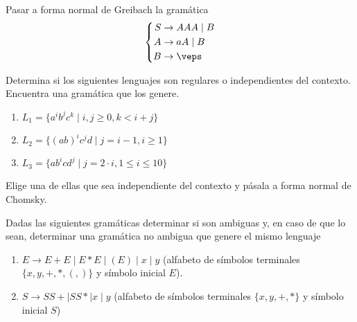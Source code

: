 \begin{ejercicio}\label{ej:1.4.12}
    Pasar a forma normal de Greibach la gramática
    \begin{equation*}
        \left\{
            \begin{aligned}
                S &\rightarrow AAA \mid B\\
                A &\rightarrow aA \mid B\\
                B &\rightarrow \veps
            \end{aligned}
        \right.
    \end{equation*}
\end{ejercicio}

\begin{ejercicio}\label{ej:1.4.13}
    Determina si los siguientes lenguajes son regulares o independientes del contexto. Encuentra una gramática que los genere.
    \begin{enumerate}
        \item $L_1 = \{ a^i b^j c^k \mid i, j \geq 0, k < i + j \}$
        \item $L_2 = \{ (ab)^i c^j d \mid j = i - 1, i \geq 1 \}$
        \item $L_3 = \{ ab^i cd^j \mid j = 2 \cdot i, 1 \leq i \leq 10 \}$
    \end{enumerate}
    Elige una de ellas que sea independiente del contexto y pásala a forma normal de Chomsky.
\end{ejercicio}

\begin{ejercicio}\label{ej:1.4.14}
    Dadas las siguientes gramáticas determinar si son ambiguas y, en caso de que lo sean, determinar una gramática no ambigua que genere el mismo lenguaje
    \begin{enumerate}
        \item $E \rightarrow E + E \mid E * E \mid (E) \mid x \mid y$ (alfabeto de símbolos terminales $\{ x, y, +, *, (, ) \}$ y símbolo inicial $E$).
        \item $S \rightarrow SS + \mid SS * \mid x \mid y$ (alfabeto de símbolos terminales $\{ x, y, +, * \}$ y símbolo inicial $S$)
    \end{enumerate}
\end{ejercicio}

